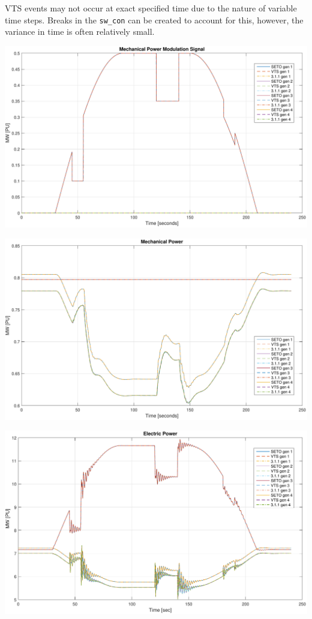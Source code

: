 \documentclass[12pt]{article}
\begin{document}
VTS events may not occur at exact specified time due to the nature of variable time steps.
Breaks in the \verb|sw_con| can be created to account for this, however, the variance in time is often relatively small.



\includegraphics[width=\linewidth]{verPmSig}

\includegraphics[width=\linewidth]{verPmech}

\includegraphics[width=\linewidth]{verPelect}
\end{document}
